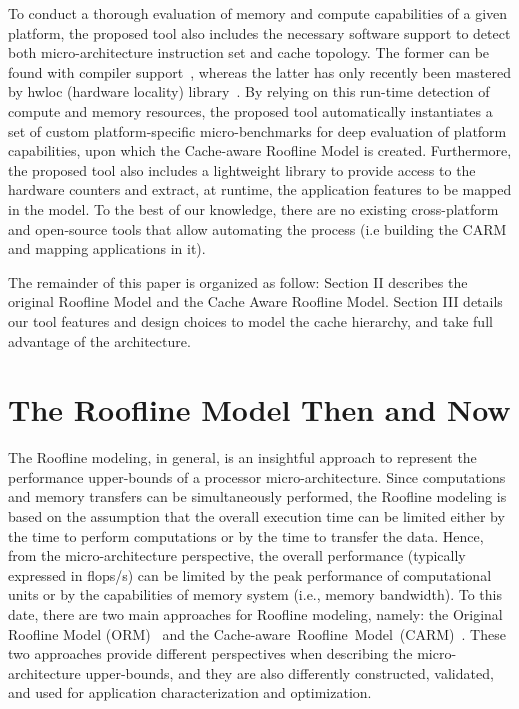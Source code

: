 \documentclass[twoside,twocolumn,8pt]{extarticle}
\begin{document}
To  conduct a thorough evaluation of memory and compute capabilities of a given platform, the proposed tool also includes the
necessary software support to detect both micro-architecture instruction set and cache topology. The former can be found with
compiler support~\cite{CompilerSupport}, whereas the latter has only recently been mastered by hwloc (hardware locality)
library~\cite{6903671}. By relying on this run-time detection of compute and memory resources, the proposed tool  automatically
instantiates a set of custom platform-specific micro-benchmarks for deep evaluation of platform capabilities, upon which the
Cache-aware Roofline Model is created. Furthermore, the proposed tool also includes a lightweight library to provide access to the
hardware counters and extract, at runtime, the application features to be mapped in the model. To the best of our knowledge, there
are no existing cross-platform and open-source tools  that allow automating the process (i.e building the CARM and mapping
applications in it). 

The remainder of this paper is organized as follow: 
Section II describes the original Roofline Model and the Cache Aware Roofline Model.  Section III details our tool features and
design choices to model the cache hierarchy, and take full advantage of the architecture.

\section{The Roofline Model Then and Now}\label{sec:state_of_art}

The Roofline modeling, in general, is an insightful approach to represent the performance upper-bounds of a processor
micro-architecture. Since computations and memory transfers can be simultaneously performed, the Roofline modeling is based on the
assumption that the overall execution time can be limited either by the time to perform computations or by the time to transfer the
data. Hence, from the micro-architecture perspective, the overall performance (typically expressed in flops/s) can be limited by
the peak performance of computational units or by the capabilities of memory system (i.e., memory bandwidth). To this date, there
are two main approaches for Roofline modeling, namely: the Original Roofline Model (ORM)~\cite{Williams:2009:RIV:1498765.1498785}
and the Cache-aware~Roofline~Model~(CARM)~\cite{ilic2014cache}.
These two approaches provide different perspectives when describing the micro-architecture upper-bounds, and they are also
differently constructed, validated, and used for application characterization and optimization.
\end{document}
